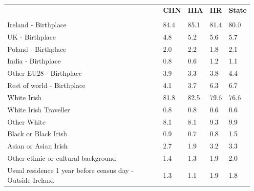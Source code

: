 \documentclass{article}
\begin{document}
\pagebreak
\begin{table}[h]	
\centering
		\begin{tabular}{KTTTT}
  \hline
& \textbf{CHN} & \textbf{IHA} & \textbf{HR}& \textbf{State}\\ 
  \hline
    \\ 
    \hline
Ireland - Birthplace & 84.4& 85.1& 81.4& 80.0\\
UK - Birthplace & 4.8& 5.2& 5.6& 5.7\\
Poland - Birthplace & 2.0& 2.2& 1.8& 2.1\\
India - Birthplace & 0.8& 0.6& 1.2& 1.1\\
Other EU28 - Birthplace & 3.9& 3.3& 3.8& 4.4\\
Rest of world - Birthplace & 4.1& 3.7& 6.3& 6.7\\
    \hline
White Irish & 81.8& 82.5& 79.6& 76.6\\
White Irish Traveller & 0.8& 0.8& 0.6& 0.6\\
Other White & 8.1& 8.1& 9.3& 9.9\\
Black or Black Irish & 0.9& 0.7& 0.8& 1.5\\
Asian or Asian Irish & 2.7& 1.9& 3.2& 3.3\\
Other ethnic or cultural background & 1.4& 1.3& 1.9& 2.0\\
    \hline
Usual residence 1 year before census day - Outside Ireland & 1.3& 1.1& 1.9& 1.8\\


\end{tabular}
\end{table}
\end{document}
